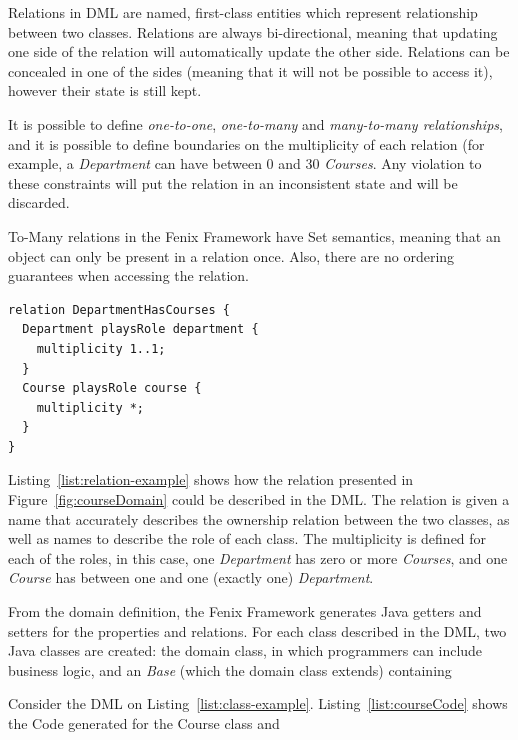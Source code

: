 Relations in DML are named, first-class entities which represent
relationship between two classes. Relations are always bi-directional,
meaning that updating one side of the relation will automatically
update the other side. Relations can be concealed in one of the sides
(meaning that it will not be possible to access it), however their
state is still kept.

It is possible to define {\it one-to-one}, {\it one-to-many} and {\it
  many-to-many relationships}, and it is possible to define boundaries
on the multiplicity of each relation (for example, a {\it Department} can
have between 0 and 30 {\it Courses}. Any violation to these
constraints will put the relation in an inconsistent state and will be
discarded. 

To-Many relations in the Fenix Framework have Set semantics, meaning
that an object can only be present in a relation once. Also, there are
no ordering guarantees when accessing the relation.

\begin{lstlisting}[caption={DML for the relation between {\it Course}
    and {\it Department}},label={list:relation-example}]
relation DepartmentHasCourses {
  Department playsRole department {
    multiplicity 1..1;
  }
  Course playsRole course {
    multiplicity *;
  }
}
\end{lstlisting}

Listing~\ref{list:relation-example} shows how the relation presented
in Figure~\ref{fig:courseDomain} could be described in the DML. The
relation is given a name that accurately describes the ownership
relation between the two classes, as well as names to describe the
role of each class. The multiplicity is defined for each of the roles,
in this case, one {\it Department} has zero or more {\it Courses}, and
one {\it Course} has between one and one (exactly one) {\it
  Department}.


From the domain definition, the Fenix Framework generates Java getters
and setters for the properties and relations. For each class described
in the DML, two Java classes are created: the domain class, in which
programmers can include business logic, and an {\it Base} (which the
domain class extends) containing 

Consider the DML on
Listing~\ref{list:class-example}. Listing~\ref{list:courseCode} shows
the Code generated for the Course class and 

